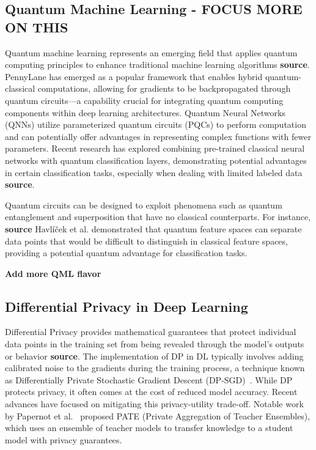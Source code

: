 \documentclass[11pt, conference]{IEEEtran}
\begin{document}
\subsection{Quantum Machine Learning - FOCUS MORE ON THIS}
Quantum machine learning represents an emerging field that applies quantum computing principles to enhance traditional machine learning algorithms \textbf{source}. PennyLane has emerged as a popular framework that enables hybrid quantum-classical computations, allowing for gradients to be backpropagated through quantum circuits—a capability crucial for integrating quantum computing components within deep learning architectures. Quantum Neural Networks (QNNs) utilize parameterized quantum circuits (PQCs) to perform computation and can potentially offer advantages in representing complex functions with fewer parameters. Recent research has explored combining pre-trained classical neural networks with quantum classification layers, demonstrating potential advantages in certain classification tasks, especially when dealing with limited labeled data \textbf{source}.

Quantum circuits can be designed to exploit phenomena such as quantum entanglement and superposition that have no classical counterparts. For instance, \textbf{source} Havlíček et al. demonstrated that quantum feature spaces can separate data points that would be difficult to distinguish in classical feature spaces, providing a potential quantum advantage for classification tasks.

\textbf{Add more QML flavor}

\subsection{Differential Privacy in Deep Learning}
Differential Privacy provides mathematical guarantees that protect individual data points in the training set from being revealed through the model's outputs or behavior \textbf{source}. The implementation of DP in DL typically involves adding calibrated noise to the gradients during the training process, a technique known as Differentially Private Stochastic Gradient Descent (DP-SGD)~\cite{abadi2016deep}. While DP protects privacy, it often comes at the cost of reduced model accuracy. Recent advances have focused on mitigating this privacy-utility trade-off. Notable work by Papernot et al.~\cite{papernot2018} proposed PATE (Private Aggregation of Teacher Ensembles), which uses an ensemble of teacher models to transfer knowledge to a student model with privacy guarantees.
\end{document}
